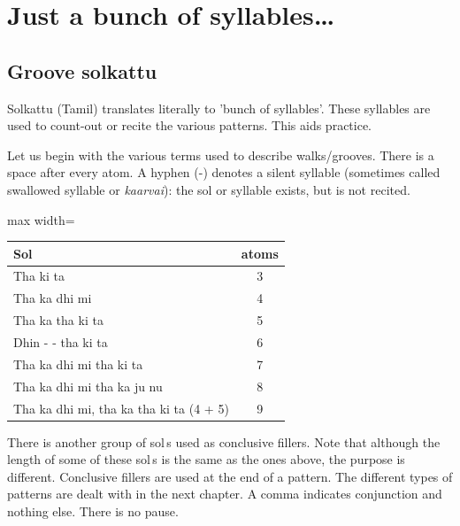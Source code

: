 \chapter{Just a bunch of syllables\ldots}

\section{Groove solkattu}

Solkattu (Tamil) translates literally to 'bunch of syllables'. These syllables are
used to count-out or recite the various patterns. This aids practice.

Let us begin with the various terms used to describe walks/grooves. There is a space
after every atom. A hyphen (-) denotes a silent syllable (sometimes called swallowed
syllable or \emph{kaarvai}): the sol or syllable exists, but is not recited.

\begin{center}
\begin{adjustbox}{max width=\textwidth}
\begin{tabular}{l c}
\toprule
Sol & atoms\\
\midrule
Tha ki ta                                  & 3\\
Tha ka dhi mi                              & 4\\
Tha ka tha ki ta                           & 5\\
Dhin - - tha ki ta                         & 6\\
Tha ka dhi mi tha ki ta                    & 7\\
Tha ka dhi mi tha ka ju nu                 & 8\\
Tha ka dhi mi, tha ka tha ki ta (4 + 5)    & 9\\
\bottomrule
\end{tabular}
\end{adjustbox}
\end{center}

There is another group of sol\,s used as conclusive fillers. Note that although the
length of some of these sol\,s is the same as the ones above, the purpose is
different. Conclusive fillers are used at the end of a pattern. The different types
of patterns are dealt with in the next chapter. A comma indicates conjunction and
nothing else. There is no pause.

